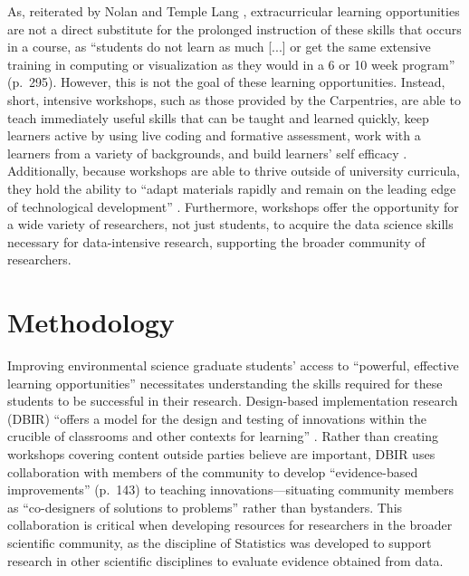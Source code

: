 \documentclass[12pt]{article}
\begin{document}
\quad As, reiterated by Nolan and Temple Lang \citeyear{esr}, extracurricular
learning opportunities are not a direct substitute for the prolonged instruction
of these skills that occurs in a course, as ``students do not learn as much 
[...] or get the same extensive training in computing or visualization as
they would in a 6 or 10 week program'' (p.\ 295). However, this is not the goal 
of these learning opportunities. Instead, short, intensive workshops, such as
those provided by the Carpentries, are able to teach immediately useful skills
that can be taught and learned quickly, keep learners active by using live
coding and formative assessment, work with a learners from a variety of
backgrounds, and build learners' self efficacy \citep{null-carpentries}.
Additionally, because workshops are able to thrive outside of university
curricula, they hold the ability to ``adapt materials rapidly and remain on the
leading edge of technological development'' \citep[p.\ 547]{hampton}.
Furthermore, workshops offer the opportunity for a wide variety of researchers,
not just students, to acquire the data science skills necessary for
data-intensive research, supporting the broader community of researchers. 

\section{Methodology}

\quad Improving environmental science graduate students' access to ``powerful,
effective learning opportunities'' \citep[p. 137]{penuel} necessitates
understanding the skills required for these students to be successful in their
research. Design-based implementation research (DBIR) \citep{confrey, penuel,
oneill} ``offers a model for the design and testing of innovations
within the crucible of classrooms and other contexts for learning'' 
\citep[p.\ 140]{penuel}. Rather than creating workshops covering content outside
parties believe are important, DBIR uses collaboration with members of the
community to develop ``evidence-based improvements'' (p.\ 143) to teaching 
innovations---situating community members as ``co-designers of solutions to 
problems'' \citep[p. 140]{penuel} rather than bystanders. This collaboration 
is critical when developing resources for researchers in the broader scientific
community, as the discipline of Statistics was developed to support research in
other scientific disciplines to evaluate evidence obtained from data. 
\end{document}

